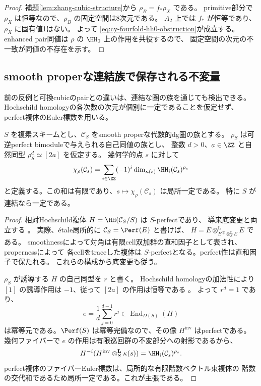 \begin{proof}
 補題\ref{lem:zhang-cubic-structure}から \(\rho_B=f_*\rho_X\) である。
 primitive部分で \(\rho_X\) は恒等なので、\(\rho_B\) の固定空間は8次元である。
 \(A_2\) 上では \(f_*\) が恒等であり、\(\rho_X\) に固有値1はない。
 よって \eqref{eq:cy-fourfold-hh0-obstruction}が成立する。
 enhanced pair同値は \(\rho\) の \(\HH_0\) 上の作用を共役するので、
 固定空間の次元の不一致が同値の不存在を示す。
\end{proof}

\subsection{smooth properな連結族で保存される不変量}

前の反例と可換cubicのpairとの違いは、連結な圏の族を通じても検出できる。
Hochschild homologyの各次数の次元が個別に一定であることを仮定せず、
perfect複体のEuler標数を用いる。

\begin{proposition}[rotation不変Euler標数の局所一定性]
\label{prop:rotation-euler-locally-constant}
 \(S\) を複素スキームとし、\(\mathcal C_S\) をsmooth properな代数的dg圏の族とする。
 \(\rho_S\) は可逆perfect bimoduleで与えられる自己同値の族とし、
 整数 \(d>0\)、\(a\in\ZZ\) と自然同型 \(\rho_S^d\simeq[2a]\) を仮定する。
 幾何学的点 \(s\) に対して
 \[
 \chi_{\rho}(\mathcal C_s)
   =\sum_{i\in\ZZ}(-1)^i
        \dim_{\kappa(s)}\HH_i(\mathcal C_s)^{\rho_s}
 \]
 と定義する。この和は有限であり、\(s\mapsto\chi_{\rho}(\mathcal C_s)\) は局所一定である。
 特に \(S\) が連結なら一定である。
\end{proposition}
\begin{proof}
 相対Hochschild複体 \(H=\HH(\mathcal C_S/S)\) は \(S\)-perfectであり、
 導来底変更と両立する \cite[Lemmas 3.4, 3.6]{PerryIHC}。
 実際、étale局所的に \(\mathcal C_S=\Perf(E)\) と書けば、
 \(H=E\otimes^{\mathbf L}_{E^{\mathrm{op}}\otimes^{\mathbf L}_S E}E\) である。
 smoothnessによって対角は有限cell双加群の直和因子として表され、propernessによって
 各cellをtraceした複体は \(S\)-perfectとなる。perfect性は直和因子で保たれる。
 これらの構成から底変更も従う。

 \(\rho_S\) が誘導する \(H\) の自己同型を \(r\) と書く。
 Hochschild homologyの加法性により \([1]\) の誘導作用は \(-1\)、従って
 \([2a]\) の作用は恒等である \cite[Section 4, Example 5.6]{CisinskiTabuada}。
 よって \(r^d=1\) であり、
 \[
 e=\frac1d\sum_{j=0}^{d-1}r^j\in\operatorname{End}_{D(S)}(H)
 \]
 は冪等元である。\(\Perf(S)\) は冪等完備なので、その像 \(H^{\mathrm{inv}}\) はperfectである。
 幾何ファイバーで \(e\) の作用は有限巡回群の不変部分への射影であるから、
 \[
 H^{-i}(H^{\mathrm{inv}}\otimes_S^{\mathbf L}\kappa(s))
     =\HH_i(\mathcal C_s)^{\rho_s}.
 \]
 perfect複体のファイバーEuler標数は、局所的な有限階数ベクトル束複体の
 階数の交代和であるため局所一定である。これが主張である。
\end{proof}

